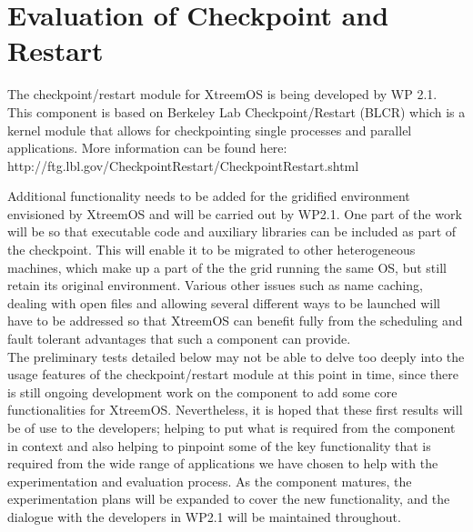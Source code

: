 \section{Evaluation of Checkpoint and Restart}


The checkpoint/restart module for XtreemOS is being developed by WP 2.1. This component is based on Berkeley Lab Checkpoint/Restart (BLCR) which is a kernel module that allows for checkpointing single processes and parallel applications. More information can be found here:\\
http://ftg.lbl.gov/CheckpointRestart/CheckpointRestart.shtml

Additional functionality needs to be added for the gridified environment envisioned by XtreemOS and will be carried out by WP2.1. One part of the work will be so that executable code and auxiliary libraries can be included as part of the checkpoint. This will enable it to be migrated to other heterogeneous machines, which make up a part of the the grid running the same OS, but still retain its original environment. Various other issues such as name caching, dealing with open files and allowing several different ways to be launched will have to be addressed so that XtreemOS can benefit fully from the scheduling and fault tolerant advantages that such a component can provide.\\

The preliminary tests detailed below may not be able to delve too deeply into the usage features of the checkpoint/restart module at this point in time, since there is still ongoing development work on the component to add some core functionalities for XtreemOS. Nevertheless, it is hoped that these first results will be of use to the developers; helping to put what is required from the component in context and also helping to pinpoint some of the key functionality that is required from the wide range of applications we have chosen to help with the experimentation and evaluation process. As the component matures, the experimentation plans will be expanded to cover the new functionality, and the dialogue with the developers in WP2.1 will be maintained throughout.\\
%

